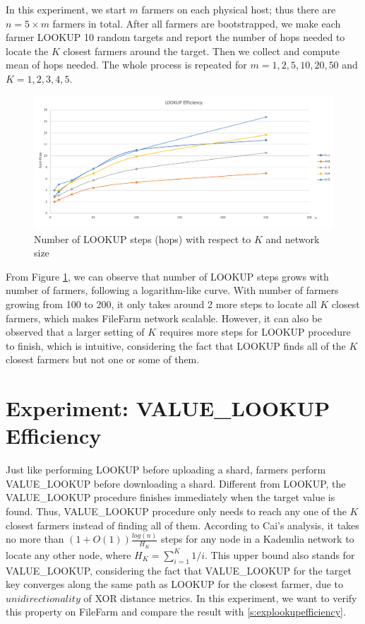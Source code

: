 In this experiment, we start $m$ farmers on each physical host; thus there are $n = 5 \times m$ farmers in total. After all farmers are bootstrapped, we make each farmer LOOKUP 10 random targets and report the number of hops needed to locate the $K$ closest farmers around the target. Then we collect and compute mean of hops needed. The whole process is repeated for $m=1,2,5,10,20,50$ and $K=1,2,3,4,5$.

\begin{figure}[hbt]
\centering
  \includegraphics[width=14cm]{charts/chart_lookup_efficiency.png}
  \caption{Number of LOOKUP steps (hops) with respect to $K$ and network size}
  \label{fig:lookupefficiency}
\end{figure}

From Figure \ref{fig:lookupefficiency}, we can observe that number of LOOKUP steps grows with number of farmers, following a logarithm-like curve. With number of farmers growing from 100 to 200, it only takes around 2 more steps to locate all $K$ closest farmers, which makes FileFarm network scalable. However, it can also be observed that a larger setting of $K$ requires more steps for LOOKUP procedure to finish, which is intuitive, considering the fact that LOOKUP finds all of the $K$ closest farmers but not one or some of them.


\section{Experiment: VALUE\_LOOKUP Efficiency}
\label{s:expvaluelookupefficiency}

Just like performing LOOKUP before uploading a shard, farmers perform VALUE\_LOOKUP before downloading a shard. Different from LOOKUP, the VALUE\_LOOKUP procedure finishes immediately when the target value is found. Thus, VALUE\_LOOKUP procedure only needs to reach any one of the $K$ closest farmers instead of finding all of them. According to Cai's analysis\cite{cai2013probabilistic}, it takes no more than $(1+O(1))\frac{log(n)}{H_{K}}$ steps for any node in a Kademlia network to locate any other node, where $H_K = \sum_{i=1}^{K} 1/i$. This upper bound also stands for VALUE\_LOOKUP, considering the fact that VALUE\_LOOKUP for the target key converges along the same path as LOOKUP for the closest farmer, due to $unidirectionality$ of XOR distance metrics. In this experiment, we want to verify this property on FileFarm and compare the result with \ref{s:explookupefficiency}.


